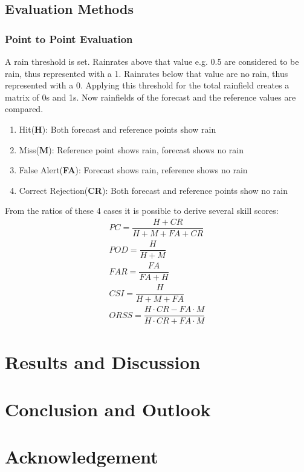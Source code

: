 \documentclass[11pt,twoside,a4paper,fleqn]{report}
\numberwithin{equation}{chapter}
\numberwithin{figure}{chapter}
\numberwithin{table}{chapter}
\begin{document}
\section{Evaluation Methods}
\subsection{Point to Point Evaluation}
A rain threshold is set. Rainrates above that value e.g. 0.5 are considered to be rain, thus represented with a 1. Rainrates below that value are no rain, thus represented with a 0. Applying this threshold for the total rainfield creates a matrix of 0s and 1s. Now rainfields of the forecast and the reference values are compared.
\begin{enumerate}
	\item Hit(\textbf{H}): Both forecast and reference points show rain
	\item Miss(\textbf{M}): Reference point shows rain, forecast shows no rain
	\item False Alert(\textbf{FA}): Forecast shows rain, reference shows no rain
	\item Correct Rejection(\textbf{CR}): Both forecast and reference points show no rain
\end{enumerate}
From the ratios of these 4 cases it is possible to derive several skill scores:
\begin{equation}
\begin{array}{lcl}
	PC = \dfrac{H+CR}{H+M+FA+CR}\\
	POD = \dfrac{H}{H+M}\\
	FAR = \dfrac{FA}{FA+H}\\
	CSI = \dfrac{H}{H+M+FA}\\
	ORSS = \dfrac{H\cdot CR-FA\cdot M}{H\cdot CR+FA\cdot M}
\end{array}
\end{equation}
\chapter{Results and Discussion}
\chapter{Conclusion and Outlook}
\chapter{Acknowledgement}

\end{document}

